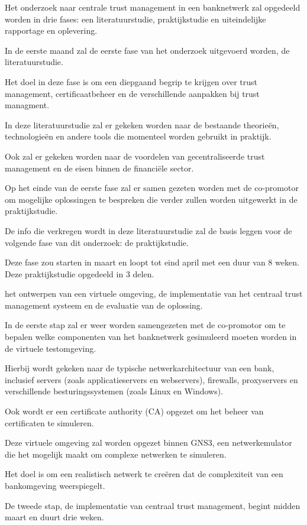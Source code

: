 Het onderzoek naar centrale trust management in een banknetwerk zal opgedeeld worden in drie fases: een literatuurstudie, praktijkstudie en uiteindelijke rapportage en oplevering.

In de eerste maand zal de eerste fase van het onderzoek uitgevoerd worden, de literatuurstudie.

Het doel in deze fase is om een diepgaand begrip te krijgen over trust management, certificaatbeheer en de verschillende aanpakken bij trust managment.

In deze literatuurstudie zal er gekeken worden naar de bestaande theorieën, technologieën en andere tools die momenteel worden gebruikt in praktijk.

Ook zal er gekeken worden naar de voordelen van gecentraliseerde trust management en de eisen binnen de financiële sector.

Op het einde van de eerste fase zal er samen gezeten worden met de co-promotor om mogelijke oplossingen te bespreken die verder zullen worden uitgewerkt in de praktijkstudie.

De info die verkregen wordt in deze literatuurstudie zal de basis leggen voor de volgende fase van dit onderzoek: de praktijkstudie.

Deze fase zou starten in maart en loopt tot eind april met een duur van 8 weken. Deze praktijkstudie opgedeeld in 3 delen.

het ontwerpen van een virtuele omgeving, de implementatie van het centraal trust management systeem en de evaluatie van de oplossing.

In de eerste stap zal er weer worden samengezeten met de co-promotor om te bepalen welke componenten van het banknetwerk gesimuleerd moeten worden in de virtuele testomgeving.

Hierbij wordt gekeken naar de typische netwerkarchitectuur van een bank, inclusief servers (zoals applicatieservers en webservers), firewalls, proxyservers en verschillende besturingssystemen (zoals Linux en Windows).

Ook wordt er een certificate authority (CA) opgezet om het beheer van certificaten te simuleren.

Deze virtuele omgeving zal worden opgezet binnen GNS3, een netwerkemulator die het mogelijk maakt om complexe netwerken te simuleren.

Het doel is om een realistisch netwerk te creëren dat de complexiteit van een bankomgeving weerspiegelt.

De tweede stap, de implementatie van centraal trust management, begint midden maart en duurt drie weken.

